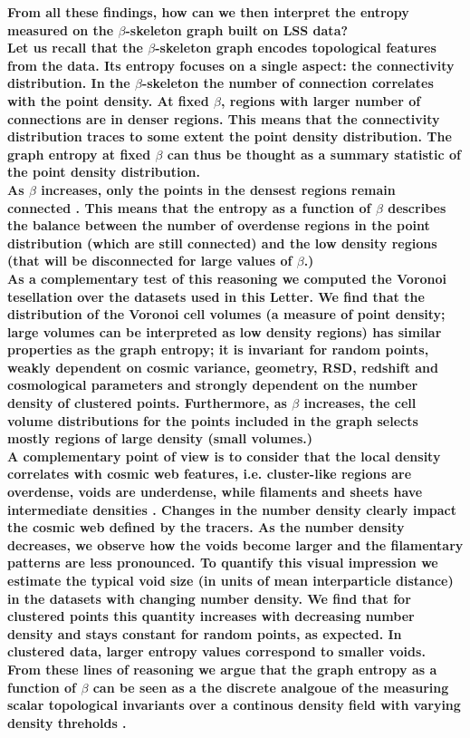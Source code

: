 \documentclass[fleqn,usenatbib]{mnras}
\begin{document}
\textbf{From all these findings, how can we then interpret the entropy measured on the
  $\beta$-skeleton graph built on LSS data?\\
\indent
Let us recall that the $\beta$-skeleton graph encodes topological
features from the data.
  Its entropy focuses on a single aspect: the connectivity distribution.
  In the $\beta$-skeleton the number of connection correlates with the
  point density.
  At fixed $\beta$, regions with larger number of connections are in 
  denser regions.
  This means that the connectivity distribution traces to some extent
  the point density distribution.
  The graph entropy at fixed $\beta$ can thus be thought as a summary
  statistic of the point density distribution.\\
\indent
  As $\beta$ increases, only the points in the densest regions remain
  connected \citep{2019MNRAS.485.5276F}.
  This means that the entropy as a function of $\beta$ describes the
  balance between the number of 
  overdense regions in the point distribution (which are still
  connected) and the low density regions (that will be disconnected
  for large values of $\beta$.)\\
\indent
As a complementary test of this reasoning we computed the Voronoi
tesellation over the datasets used in this Letter. 
We find that the distribution of the Voronoi cell volumes (a measure
of point density; large volumes can be interpreted as low density regions) 
has similar properties as the graph entropy; it is invariant for random points,
weakly dependent on cosmic variance, geometry, RSD, redshift and
cosmological parameters and strongly dependent on the number density
of clustered points.
Furthermore, as $\beta$ increases, the cell volume distributions for the points included in
the graph selects mostly regions of large density (small volumes.)\\
\indent
A complementary point of view is to consider that the local density
correlates with cosmic web features,
i.e. cluster-like regions are overdense, voids are underdense, while filaments and sheets have
 intermediate densities \citep{2018MNRAS.473.1195L}. 
 Changes in the number density clearly impact the cosmic web defined by the tracers.
  As the number density decreases, we observe how the voids become
  larger and the filamentary patterns are less pronounced.  
  To quantify this visual impression we estimate the typical void size
  (in units of mean interparticle distance)
  in the datasets with changing number density.  
  We find that for clustered points this quantity increases with
  decreasing number density and stays constant for random points,
  as expected.
  In clustered data, larger entropy values correspond to smaller voids.\\
\indent
From these lines of reasoning we argue that the graph entropy as a
  function of $\beta$ can be seen as a the discrete analgoue of
  the measuring scalar topological invariants 
  over a continous density field with varying density threholds \citep{2013JKAS...46..125P}.}
\end{document}
